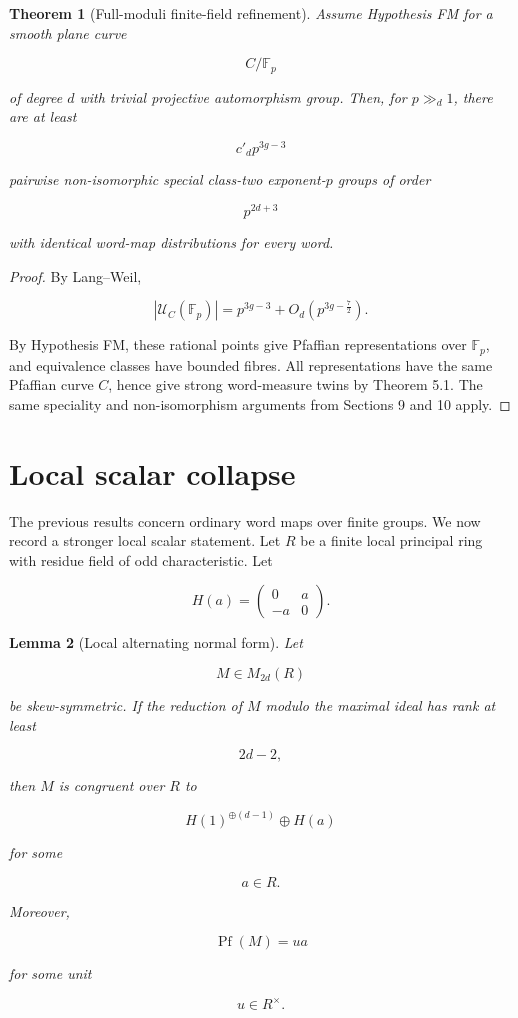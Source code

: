 \documentclass[11pt]{article}
\newtheorem{theorem}{Theorem}[section]
\newtheorem{lemma}[theorem]{Lemma}
\begin{document}
\begin{theorem}[Full-moduli finite-field refinement]
Assume Hypothesis FM for a smooth plane curve

\[
C/\mathbb F_p
\]

of degree $d$ with trivial projective automorphism group. Then, for $p\gg_d1$, there are at least

\[
c'_d p^{3g-3}
\]

pairwise non-isomorphic special class-two exponent-$p$ groups of order

\[
p^{2d+3}
\]

with identical word-map distributions for every word.

\end{theorem}

\begin{proof}
By Lang--Weil,

\[
|\mathcal U_C(\mathbb F_p)|
=p^{3g-3}+O_d(p^{3g-\frac72}).
\]

By Hypothesis FM, these rational points give Pfaffian representations over $\mathbb F_p$, and equivalence classes have bounded fibres. All representations have the same Pfaffian curve $C$, hence give strong word-measure twins by Theorem 5.1. The same speciality and non-isomorphism arguments from Sections 9 and 10 apply.

\end{proof}

\section{Local scalar collapse}

The previous results concern ordinary word maps over finite groups. We now record a stronger local scalar statement. Let $R$ be a finite local principal ring with residue field of odd characteristic. Let

\[
H(a)=
\begin{pmatrix}
0 & a\\
-a & 0
\end{pmatrix}.
\]

\begin{lemma}[Local alternating normal form]
Let

\[
M\in M_{2d}(R)
\]

be skew-symmetric. If the reduction of $M$ modulo the maximal ideal has rank at least

\[
2d-2,
\]

then $M$ is congruent over $R$ to

\[
H(1)^{\oplus(d-1)}\oplus H(a)
\]

for some

\[
a\in R.
\]

Moreover,

\[
\operatorname{Pf}(M)=u a
\]

for some unit

\[
u\in R^\times.
\]

\end{lemma}
\end{document}
